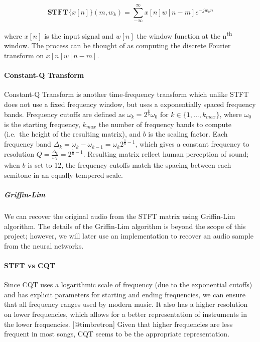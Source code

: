 \documentclass[]{report}
\begin{document}
\begin{equation}
    \mathbf{STFT}\{x[n]\}(m, w_k) = \sum_{-\infty}^{\infty} x[n]w[n - m]e^{-jw_kn}
\end{equation}

where \(x[n]\) is the input signal and \(w[n]\) the window function at
the n\textsuperscript{th} window. The process can be thought of as
computing the discrete Fourier transform on \(x[n]w[n - m]\).

\paragraph{Constant-Q Transform}

Constant-Q Transform is another time-frequency transform which unlike
STFT does not use a fixed frequency window, but uses a exponentially
spaced frequency bands. Frequency cutoffs are defined as
\(\omega_k = 2^{\frac{k}{b}} \omega_0\) for
\(k \in \{ 1, ..., k_{max}\}\), where \(\omega_0\) is the starting
frequency, \(k_{max}\) the number of frequency bands to compute
(i.e.~the height of the resulting matrix), and \(b\) is the scaling
factor. Each frequency band
\(\Delta_k = \omega_k - \omega_{k-1} = \omega_k 2^{\frac{1}{b} - 1}\),
which gives a constant frequency to resolution
\(Q = \frac{\Delta_k}{\omega_k} = 2^{\frac{1}{b} -1}\). Resulting matrix
reflect human perception of sound; when \(b\) is set to 12, the
frequency cutoffs match the spacing between each semitone in an equally
tempered scale.

\subparagraph{Griffin-Lim}

We can recover the original audio from the STFT matrix using Griffin-Lim
algorithm. The details of the Griffin-Lim algorithm is beyond the scope
of this project; however, we will later use an implementation to recover
an audio sample from the neural networks.

\paragraph{STFT vs CQT}

Since CQT uses a logarithmic scale of frequency (due to the exponential
cutoffs) and has explicit parameters for starting and ending
frequencies, we can ensure that all frequency ranges used by modern
music. It also has a higher resolution on lower frequencies, which
allows for a better representation of instruments in the lower
frequencies. {[}@timbretron{]} Given that higher frequencies are less
frequent in most songs, CQT seems to be the appropriate representation.
\end{document}
